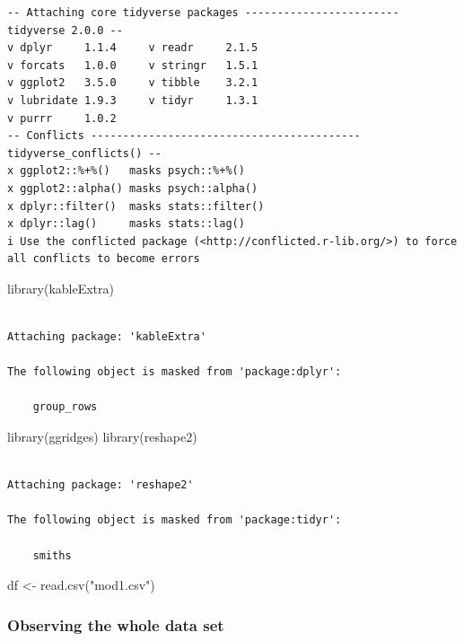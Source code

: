 \documentclass[
  letterpaper,
  DIV=11,
  numbers=noendperiod]{scrartcl}
\newenvironment{Shaded}{\begin{snugshade}}{\end{snugshade}}
\newcommand{\FunctionTok}[1]{\textcolor[rgb]{0.28,0.35,0.67}{#1}}
\newcommand{\NormalTok}[1]{\textcolor[rgb]{0.00,0.23,0.31}{#1}}
\newcommand{\OtherTok}[1]{\textcolor[rgb]{0.00,0.23,0.31}{#1}}
\newcommand{\StringTok}[1]{\textcolor[rgb]{0.13,0.47,0.30}{#1}}
\begin{document}
\begin{verbatim}
-- Attaching core tidyverse packages ------------------------ tidyverse 2.0.0 --
v dplyr     1.1.4     v readr     2.1.5
v forcats   1.0.0     v stringr   1.5.1
v ggplot2   3.5.0     v tibble    3.2.1
v lubridate 1.9.3     v tidyr     1.3.1
v purrr     1.0.2     
-- Conflicts ------------------------------------------ tidyverse_conflicts() --
x ggplot2::%+%()   masks psych::%+%()
x ggplot2::alpha() masks psych::alpha()
x dplyr::filter()  masks stats::filter()
x dplyr::lag()     masks stats::lag()
i Use the conflicted package (<http://conflicted.r-lib.org/>) to force all conflicts to become errors
\end{verbatim}

\begin{Shaded}
\begin{Highlighting}[]
\FunctionTok{library}\NormalTok{(kableExtra)}
\end{Highlighting}
\end{Shaded}

\begin{verbatim}

Attaching package: 'kableExtra'

The following object is masked from 'package:dplyr':

    group_rows
\end{verbatim}

\begin{Shaded}
\begin{Highlighting}[]
\FunctionTok{library}\NormalTok{(ggridges)}
\FunctionTok{library}\NormalTok{(reshape2)}
\end{Highlighting}
\end{Shaded}

\begin{verbatim}

Attaching package: 'reshape2'

The following object is masked from 'package:tidyr':

    smiths
\end{verbatim}

\begin{Shaded}
\begin{Highlighting}[]
\NormalTok{df }\OtherTok{\textless{}{-}} \FunctionTok{read.csv}\NormalTok{(}\StringTok{"mod1.csv"}\NormalTok{)}
\end{Highlighting}
\end{Shaded}

\subsubsection{Observing the whole data
set}\label{observing-the-whole-data-set}
\end{document}
